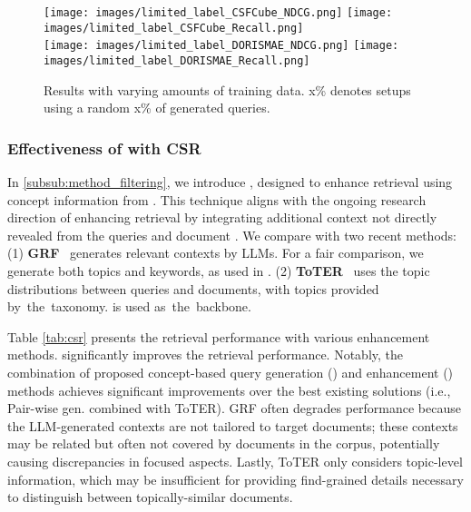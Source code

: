 \begin{figure}[t]
\centering
\texttt{[image: images/limited\_label\_CSFCube\_NDCG.png]}
\texttt{[image: images/limited\_label\_CSFCube\_Recall.png]}\hspace{-0.1cm}\\ \hspace{-0.3cm}
\texttt{[image: images/limited\_label\_DORISMAE\_NDCG.png]}
\texttt{[image: images/limited\_label\_DORISMAE\_Recall.png]}\hspace{-0.1cm}
\caption{Results with varying amounts of training data.
x\% denotes setups using a random x\% of generated queries.
}
\label{fig:amount}
\end{figure}



\subsubsection{\textbf{Effectiveness of \proposed with CSR}}
In \cref{subsub:method_filtering}, we introduce \proposedtwo, designed to enhance retrieval using concept information from \proposed.
This technique aligns with the ongoing research direction of enhancing retrieval by integrating additional context not directly revealed from the queries and document \cite{ToTER, mackie2023generative, BERTQE, DensePRF}.
We compare \proposedtwo with two recent methods:
(1) \textbf{GRF}~\cite{mackie2023generative} generates relevant contexts by LLMs. For a fair comparison, we generate both topics and keywords, as used in \proposed.
(2) \textbf{ToTER}~\cite{ToTER} uses the topic distributions between queries and documents, with topics provided by~the~taxonomy.
\ctr is used as~the~backbone.

Table \ref{tab:csr} presents the retrieval performance with various enhancement methods.
\proposedtwo significantly improves the retrieval performance.
Notably, the combination of proposed concept-based query generation (\proposed) and enhancement (\proposedtwo) methods achieves significant improvements over the best existing solutions (i.e., Pair-wise gen. combined with ToTER).
GRF often degrades performance because the LLM-generated contexts are not tailored to target documents;
these contexts may be related but often not covered by documents in the corpus, potentially causing discrepancies in focused aspects.
Lastly, ToTER only considers topic-level information, which may be insufficient for providing find-grained details necessary to distinguish between topically-similar documents.




